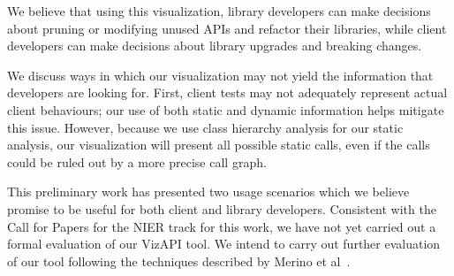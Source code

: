 \label{sec:discussion}
We believe that using this visualization, library developers can make
decisions about pruning or modifying unused APIs and refactor their
libraries, while client developers can make decisions about library
upgrades and breaking changes.


We discuss ways in which our visualization may not yield the
information that developers are looking for. First, client tests may
not adequately represent actual client behaviours; our use of both static
and dynamic information helps mitigate this issue. However, because we use
class hierarchy analysis for our static analysis, our visualization will present
all possible static calls, even if the calls could be ruled out by a more
precise call graph.

This preliminary work has presented two usage scenarios which we
believe promise to be useful for both client and library
developers. Consistent with the Call for Papers for the NIER track for
this work, we have not yet carried out a formal evaluation of our
VizAPI tool. We intend to carry out further evaluation of our tool
following the techniques described by Merino et al~\cite{merino}.


